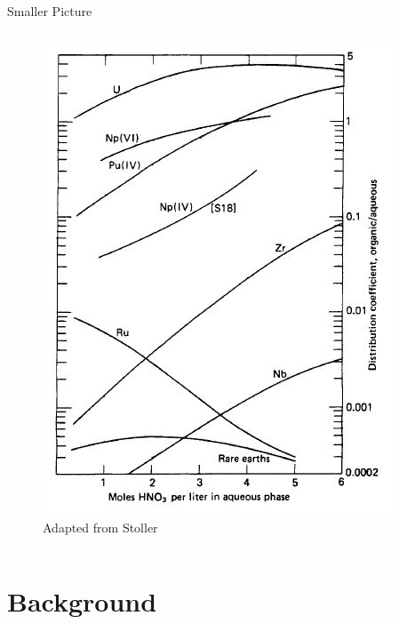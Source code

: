 \documentclass{beamer}
\newcommand{\tss}{\textsuperscript}
\begin{document}
\begin{frame}{Smaller Picture}
\begin{columns}
\begin{column}{0.5\textwidth}
\begin{figure}[H]
\begin{center}
	  \includegraphics[scale = 0.5]{Stoller}
          \vspace{-0.5cm}
           \caption{\tiny{Adapted from Stoller\tss{\cite{stoller1961reactor}}}}
	\end{center}
      \end{figure}
    \end{column}
  \end{columns}  
\end{frame}


\section{Background}
\begin{frame}
\sectionpage
\end{frame}
\end{document}
